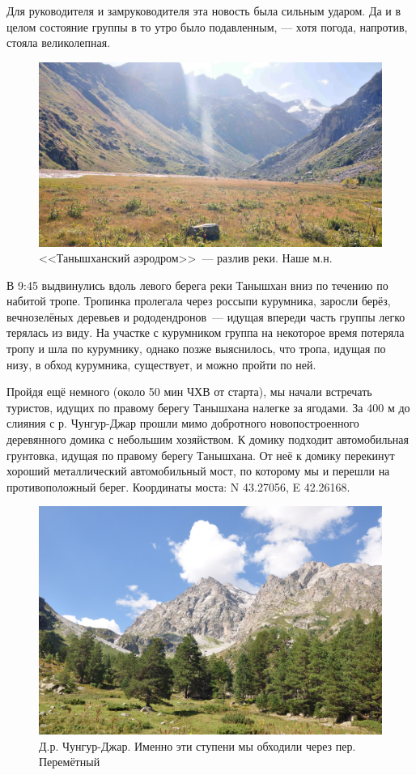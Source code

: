 Для руководителя и замруководителя эта новость была сильным ударом. Да и в целом состояние группы в то утро было подавленным, --- хотя погода, напротив, стояла великолепная.
\begin{figure}[h!]
	\centering
	\includegraphics[width=0.7\linewidth]{../pics/DSC_0434 2.jpg}
	\caption{<<Танышханский аэродром>>~--- разлив реки. Наше м.н.}
	\label{fig:DSC_0434}
\end{figure}

В 9:45 выдвинулись вдоль левого берега реки Танышхан вниз по течению по набитой тропе. Тропинка пролегала через россыпи курумника, заросли берёз, вечнозелёных деревьев  и рододендронов~--- идущая впереди часть группы легко терялась из виду. На участке с курумником группа на некоторое время потеряла тропу и шла по курумнику, однако позже выяснилось, что тропа, идущая по низу, в обход курумника, существует, и можно пройти по ней. 

Пройдя ещё немного (около 50 мин ЧХВ от старта), мы начали встречать туристов, идущих по правому берегу Танышхана налегке за ягодами. За 400 м до слияния с р. Чунгур-Джар прошли мимо добротного новопостроенного деревянного домика с небольшим хозяйством. К домику подходит автомобильная грунтовка, идущая по правому берегу Танышхана. От неё к домику перекинут хороший металлический автомобильный мост, по которому мы и перешли на противоположный берег. Координаты моста: N 43.27056\degree, E 42.26168\degree. 
 
\begin{figure}[h!]
	\centering
	\includegraphics[width=0.7\linewidth]{../pics/DSC_0459 2}
	\caption{Д.р. Чунгур-Джар. Именно эти ступени мы обходили через пер. Перемётный}
	\label{fig:DSC_0459}
\end{figure}

